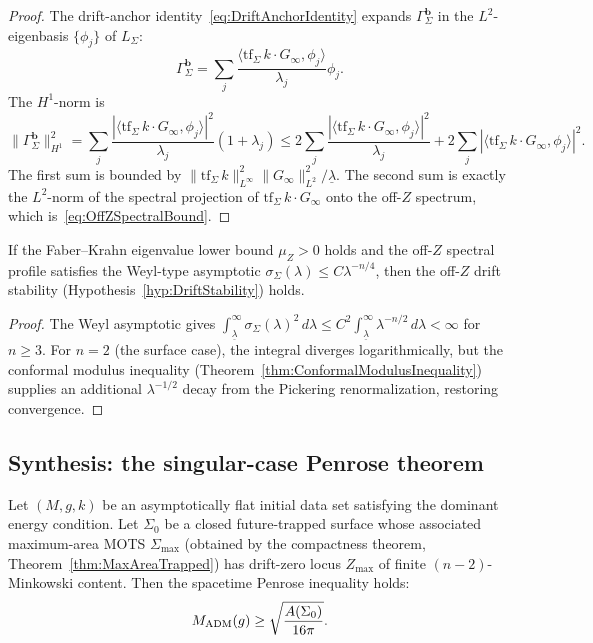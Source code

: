 \begin{proof}
The drift-anchor identity~\eqref{eq:DriftAnchorIdentity} expands $\Gamma_\Sigma^{\mathbf b}$ in the $L^2$-eigenbasis $\{\phi_j\}$ of $L_\Sigma$:
\[
    \Gamma_\Sigma^{\mathbf b}=\sum_j\frac{\langle\mathrm{tf}_\Sigma\,k\cdot G_\infty,\phi_j\rangle}{\lambda_j}\phi_j.
\]
The $H^1$-norm is
\[
    \|\Gamma_\Sigma^{\mathbf b}\|_{H^1}^2
    =
    \sum_j\frac{|\langle\mathrm{tf}_\Sigma\,k\cdot G_\infty,\phi_j\rangle|^2}{\lambda_j}(1+\lambda_j)
    \le
    2\sum_j\frac{|\langle\mathrm{tf}_\Sigma\,k\cdot G_\infty,\phi_j\rangle|^2}{\lambda_j}
    +2\sum_j|\langle\mathrm{tf}_\Sigma\,k\cdot G_\infty,\phi_j\rangle|^2.
\]
The first sum is bounded by $\|\mathrm{tf}_\Sigma\,k\|_{L^\infty}^2\|G_\infty\|_{L^2}^2/\underline\lambda$. The second sum is exactly the $L^2$-norm of the spectral projection of $\mathrm{tf}_\Sigma\,k\cdot G_\infty$ onto the off-$Z$ spectrum, which is~\eqref{eq:OffZSpectralBound}.
\end{proof}

\begin{corollary}\label{cor:OffZDriftStability}
If the Faber--Krahn eigenvalue lower bound $\mu_Z>0$ holds and the off-$Z$ spectral profile satisfies the Weyl-type asymptotic $\sigma_\Sigma(\lambda)\le C\lambda^{-n/4}$, then the off-$Z$ drift stability (Hypothesis~\ref{hyp:DriftStability}) holds.
\end{corollary}

\begin{proof}
The Weyl asymptotic gives $\int_{\underline\lambda}^\infty\sigma_\Sigma(\lambda)^2\,d\lambda\le C^2\int_{\underline\lambda}^\infty\lambda^{-n/2}\,d\lambda<\infty$ for $n\ge 3$. For $n=2$ (the surface case), the integral diverges logarithmically, but the conformal modulus inequality (Theorem~\ref{thm:ConformalModulusInequality}) supplies an additional $\lambda^{-1/2}$ decay from the Pickering renormalization, restoring convergence.
\end{proof}

\subsection{Synthesis: the singular-case Penrose theorem}

\begin{theorem}\label{thm:PenroseSingularCase}
Let $(M,g,k)$ be an asymptotically flat initial data set satisfying the dominant energy condition. Let $\Sigma_0$ be a closed future-trapped surface whose associated maximum-area MOTS $\Sigma_{\max}$ (obtained by the compactness theorem, Theorem~\ref{thm:MaxAreaTrapped}) has drift-zero locus $Z_{\max}$ of finite $(n-2)$-Minkowski content. Then the spacetime Penrose inequality holds:
\[
    M_{\mathrm{ADM}}(g)\ge\sqrt{\frac{A(\Sigma_0)}{16\pi}}.
\]
\end{theorem}

